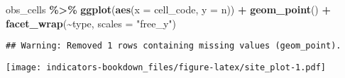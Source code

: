 \documentclass[
]{book}
\newenvironment{Shaded}{\begin{snugshade}}{\end{snugshade}}
\newcommand{\DataTypeTok}[1]{\textcolor[rgb]{0.13,0.29,0.53}{#1}}
\newcommand{\KeywordTok}[1]{\textcolor[rgb]{0.13,0.29,0.53}{\textbf{#1}}}
\newcommand{\NormalTok}[1]{#1}
\newcommand{\OperatorTok}[1]{\textcolor[rgb]{0.81,0.36,0.00}{\textbf{#1}}}
\newcommand{\StringTok}[1]{\textcolor[rgb]{0.31,0.60,0.02}{#1}}
\begin{document}
\begin{Shaded}
\begin{Highlighting}[]
\NormalTok{obs\_cells }\OperatorTok{\%\textgreater{}\%}\StringTok{ }
\StringTok{  }\KeywordTok{ggplot}\NormalTok{(}\KeywordTok{aes}\NormalTok{(}\DataTypeTok{x =}\NormalTok{ cell\_code, }\DataTypeTok{y =}\NormalTok{ n)) }\OperatorTok{+}\StringTok{ }\KeywordTok{geom\_point}\NormalTok{() }\OperatorTok{+}\StringTok{ }
\StringTok{  }\KeywordTok{facet\_wrap}\NormalTok{(}\OperatorTok{\textasciitilde{}}\NormalTok{type, }\DataTypeTok{scales =} \StringTok{"free\_y"}\NormalTok{)}
\end{Highlighting}
\end{Shaded}

\begin{verbatim}
## Warning: Removed 1 rows containing missing values (geom_point).
\end{verbatim}

\texttt{[image: indicators-bookdown\_files/figure-latex/site\_plot-1.pdf]}

  
\end{document}
